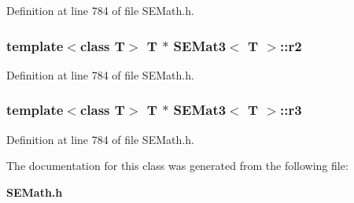 Definition at line 784 of file S\+E\+Math.\+h.

\subsubsection[{r2}]{\setlength{\rightskip}{0pt plus 5cm}template$<$class T$>$ T $\ast$ {\bf S\+E\+Mat3}$<$ T $>$\+::r2}\label{class_s_e_mat3_a78753511b1012420f8892bf3ac2a72c3}


Definition at line 784 of file S\+E\+Math.\+h.

\subsubsection[{r3}]{\setlength{\rightskip}{0pt plus 5cm}template$<$class T$>$ T $\ast$ {\bf S\+E\+Mat3}$<$ T $>$\+::r3}\label{class_s_e_mat3_acff13d72fd63f15ddff1a795d9002e14}


Definition at line 784 of file S\+E\+Math.\+h.



The documentation for this class was generated from the following file\+:\begin{DoxyCompactItemize}
\item 
{\bf S\+E\+Math.\+h}\end{DoxyCompactItemize}
